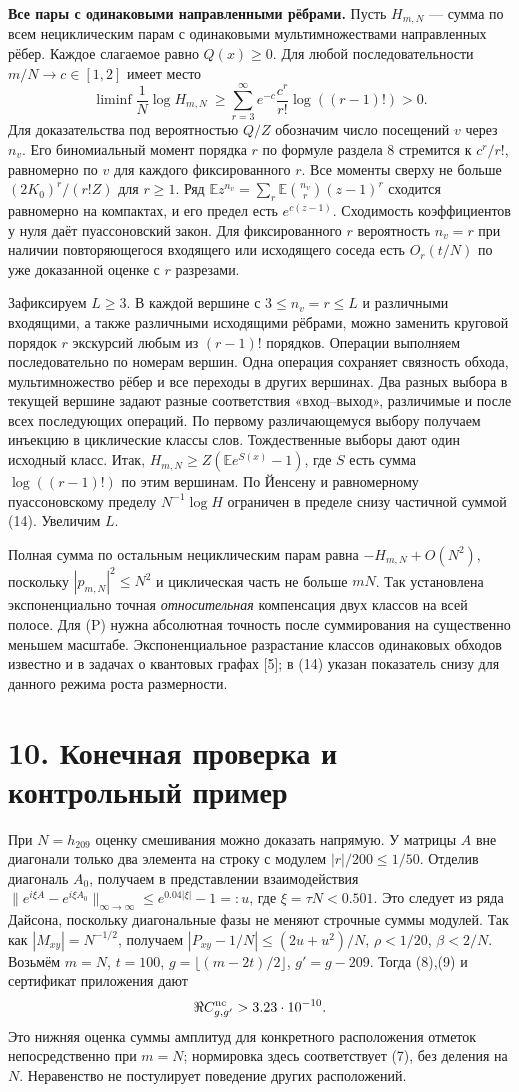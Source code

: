\documentclass[11pt,a4paper]{article}
\newcommand{\EE}{\mathbb E}
\newcommand{\sect}[1]{\section*{\sffamily\color{ink}#1}}
\newcommand{\subt}[1]{\par\medskip\noindent\textbf{#1.}\quad}
\begin{document}
\subt{Все пары с одинаковыми направленными рёбрами} Пусть $H_{m,N}$ --- сумма по всем нециклическим парам с одинаковыми мультимножествами направленных рёбер. Каждое слагаемое равно $Q(x)\ge0$. Для любой последовательности $m/N\to c\in[1,2]$ имеет место
\[
 \liminf \frac1N\log H_{m,N}\ \ge \sum_{r=3}^\infty e^{-c}\frac{c^r}{r!}\log((r-1)!)>0.                 \tag{14}
\]
Для доказательства под вероятностью $Q/Z$ обозначим число посещений $v$ через $n_v$. Его биномиальный момент порядка $r$ по формуле раздела 8 стремится к $c^r/r!$, равномерно по $v$ для каждого фиксированного $r$. Все моменты сверху не больше $(2K_0)^r/(r! Z)$ для $r\ge1$. Ряд $\EE z^{n_v}=\sum_r\EE\binom{n_v}{r}(z-1)^r$ сходится равномерно на компактах, и его предел есть $e^{c(z-1)}$. Сходимость коэффициентов у нуля даёт пуассоновский закон. Для фиксированного $r$ вероятность $n_v=r$ при наличии повторяющегося входящего или исходящего соседа есть $O_r(t/N)$ по уже доказанной оценке с $r$ разрезами.

Зафиксируем $L\ge3$. В каждой вершине с $3\le n_v=r\le L$ и различными входящими, а также различными исходящими рёбрами, можно заменить круговой порядок $r$ экскурсий любым из $(r-1)!$ порядков. Операции выполняем последовательно по номерам вершин. Одна операция сохраняет связность обхода, мультимножество рёбер и все переходы в других вершинах. Два разных выбора в текущей вершине задают разные соответствия «вход--выход», различимые и после всех последующих операций. По первому различающемуся выбору получаем инъекцию в циклические классы слов. Тождественные выборы дают один исходный класс. Итак, $H_{m,N}\ge Z(\EE e^{S(x)}-1)$, где $S$ есть сумма $\log((r-1)!)$ по этим вершинам. По Йенсену и равномерному пуассоновскому пределу $N^{-1}\log H$ ограничен в пределе снизу частичной суммой (14). Увеличим $L$.

Полная сумма по остальным нециклическим парам равна $-H_{m,N}+O(N^2)$, поскольку $|p_{m,N}|^2\le N^2$ и циклическая часть не больше $mN$. Так установлена экспоненциально точная \emph{относительная} компенсация двух классов на всей полосе. Для (P) нужна абсолютная точность после суммирования на существенно меньшем масштабе. Экспоненциальное разрастание классов одинаковых обходов известно и в задачах о квантовых графах [5]; в (14) указан показатель снизу для данного режима роста размерности.
\newpage
\sect{10. Конечная проверка и контрольный пример}
При $N=h_{209}$ оценку смешивания можно доказать напрямую. У матрицы $A$ вне диагонали только два элемента на строку с модулем $|r|/200\le 1/50$. Отделив диагональ $A_0$, получаем в представлении взаимодействия $\|e^{i\xi A}-e^{i\xi A_0}\|_{\infty\to\infty}\le e^{0.04|\xi|}-1=:u$, где $\xi=\tau N<0.501$. Это следует из ряда Дайсона, поскольку диагональные фазы не меняют строчные суммы модулей. Так как $|M_{xy}|=N^{-1/2}$, получаем $|P_{xy}-1/N|\le(2u+u^2)/N$, $\rho<1/20$, $\beta<2/N$. Возьмём $m=N$, $t=100$, $g=\lfloor(m-2t)/2\rfloor$, $g'=g-209$. Тогда (8),(9) и сертификат приложения дают
\[
 \Re C^{\rm nc}_{g,g'} >3.23\cdot10^{-10}.
\]
Это нижняя оценка суммы амплитуд для конкретного расположения отметок непосредственно при $m=N$; нормировка здесь соответствует (7), без деления на $N$. Неравенство не постулирует поведение других расположений.
\end{document}
